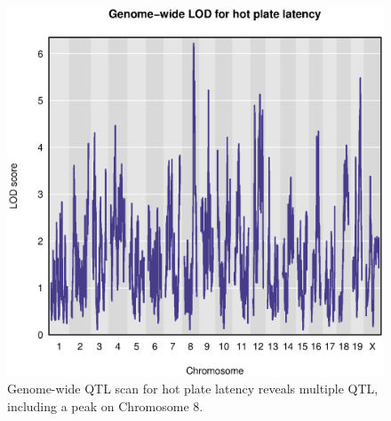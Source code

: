 \documentclass[12pt,twoside, lineno]{gsajnl}
\begin{document}
\clearpage

\begin{figure}[hb]
\includegraphics{../Rmd/genomewide_lod_trait22.eps}
\caption{Genome-wide QTL scan for hot plate latency reveals multiple
  QTL, including a peak on Chromosome 8.}
\label{fig:genomewide22}
\end{figure}
\end{document}
